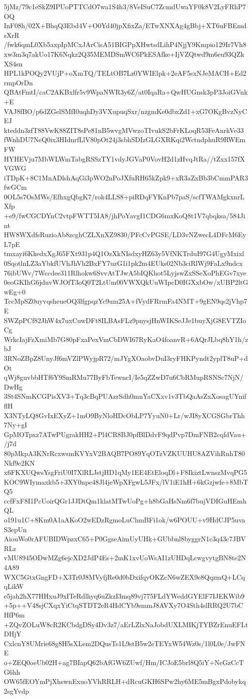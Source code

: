 5jMz/79c1eSkZ9IPUoPTTCdO7wa1S4h3/8VeISuC7ZcmdUwaYF0k8V2LyFRhP7OQ
InF08h/02X+BhqQ3Ebd4V+O0Yd40jpXfixZa/ETwXNXAg4gBbj+XT6uFBEmdsXrR
/fwk6qmL0Xb5axpIpMCxJArCisA51BIGPpXHwtsdLihP4NjjY9Kmpio129Ir7Vh8
xw3m3q7akUo17K6Nqkz2Q35MEMDSmWC6PkESAfke+IjVZQtwd9m6eu93QZkXS4sn
HPL1kPOQy2VUjP+oXmTQ/TELtOB7Lz0YWIElpk+2eAF5sxNJeMACH+Ed2rmpOrDn
QBAtFmtI/caC2AKBxlfr5v9WpaNWR3y6Z/at0IqaRa+QwHUGnsk3pP3JoiGVnk+E
VAJ8fBO/p6dZGelSMfI0uqhDy3VXupuqSxr/nzgmKe0dbxZd1+xG7OKgBvzNyCEJ
kteddn3zfT88VwK88ZIT8sPe81nB5wvgMVwzoTIvukS2bFrKLoqR53FeAnrkVe33
fWnhDU7NeQ0ix3HIdnrfLlV80pOt24j3sbhSDIzGLGXRKqi2WctndphuR9RWEmFW
HYHEVju7MbWLWmTabgRSSzTY1vdyJGVaP0VovH2d1zHvqJtRa//tZxx157fXVGWG
iTDpK+8C1MnADlshAqGi3pWO2nPoJXfuRH65kZpk9+xR3aZxBb3bCmmPAR3fwGCm
0OL5s7OsMWs/EfhxgQbgK7/rok4LLS8+piRDqFYKnPb7paS/scfTWAMgkxnrLXfp
+e9/fwCGCDYnC2vtpFWTT5IA8/jhPoYavgI1CDG6mxKoQ8t1V7qbqksa/584Jint
HW8WXdfsRuzioAb8zcghCZLXnXZ9830/PFcCvPGSE/LD3vNZwecL4DFcM6EyL7pE
tmxayi6KkedxXgJ65FXt931p4Q1OzXkNIsdxyHZ63y5VfNKTrduI97G4UgyMxixl
0SqotlnLZ3aYbkfUVhJhVh2BxFY7uzG1i1pk2m4EUks02Nb3ciRlWj9FaLx9ndcx
76ibUWv/7Wccdee311Rlhokw6SvvAtTJwA5bIQKhot5LyjswZxSSeXoPhEGv7xye
0eoGKIhG6jduvWJOfT3oQ0T2LtUm00VWXQkUuWIpcD0IGXxbOw/xUBP2ltGwEg+0
TccMpSZ0uyvqsheueOQ3lfgpqzYc9um25A+fVydFRrmFa4NMT+9gEN9qs2jVhp7E
SWZpPCf82JhW4x7uxCuwDFt8ILBAsFLz9pnysjHnWIKSeJJe1buyXjG8EVTZIoCg
WrkcIajFzXmiMb7G80pFxaPexVmCbDWI67RyKaO4foanvR+6AQrJLbq8hY1h/zbJ
3RNoZBpZ8UnyJf6mVZlPWyjpR72/mJYgXOaobvDuI3ryFHKPyndt2yplT8uP+dOt
qWj8guvbbHTf6Y9SmRMu77ByFbTewncI/Ie5qZZwD7u6CbRMupRSNSc7NjN/DwHg
3St4SNmKCGPisXV3+Tq3cBqPUAzrSdh0mnYaCXxv1v3TbQaAsZxXosagUYnifflH
X3NTyLQ8GvIxEXyZ+1mO9ByNloHDcObLP7YyuN0+Lr/wJI8yXCGSGbrThh7Ny+gI
GpMOTpxz7ATwPUgrakHH2+Pl4CR8BJ0pfBlDdvF9qdPvp7DmFNB2cqfdVau+/j7d
80pMkpA3KNrRcxwsmKVYxV2BAQB7PO89YqOTzVZKUUHU8AZVihRnhT80Nkf9e2KN
x6FKXUQwsYsgFriU0I7XlRLJstjHD1qMy1EE4EtEloqDl+F8IkiztLwnszMvqPG5
KOC9WIymaxkb5+3XY0npe48Jl4jeWpXFgwL5JFx/lV1iE1hH+6kGzjwfe+8MbTQ5
ccfFxF8I1PcUoirQGr1JJDtQm1klatMTwUoPg+h8bGaHsNm6f7bujVDIGuHEmhQL
o191u1C+8Km0A1aAKoO2wEDzRgmoLuChmBFi1ok/w6POUU+v9HdCJP5uvaS3epUn
AiouWo0rAFUBIDWpzxC65+P0GgseAimUyUHk+GUbbnl8byggrN1c3q43c7JBVRLz
vMU8945ODwMZg6ejcXD2JdP4Es+2mK1xvUoWsAI1zUHDqLcwgvytgBN8te2N4A89
WXC5GtxGngFD+X3Tr0J8MVyfjRe0d0bDxifqyOKZcN6wZEX9e8QqzmQ+LCqqLikW
e5jah2hX77HHxuJ9xITeRdlhyq6uZkzI3mq89vj775FLdYWeddGYElF7IJEKWib9
+5p++V48sjCXqxYiCtqSTDT2eR4HdCYb9smmJ8AVXy7O4Sth4slRRQ2U7bCHfP6m
+ZQvZOLuW8cR2KCbdgDSy4Dv3z7/aErLZlxNaJobdUXLMIKjTYBZrEnuEFLtDHjY
CxlcnY8UMrie68g8H5sXLem2DQusTs1L9stB5w2eTEYxW54Wz0s/1l0L0e/JwFNE
o+ZEQ0oeUb02H+ag7BIapQ62bAfGW6ZUwf/Hm/ICJoE5brl8Q5iY+NeGzCcTG6hh
OW65fEOYmPjXhswnExuoYVhRRLH+dRcuGKH6SPw2hy6ME5mBgxPdobykq2sgYvdp
